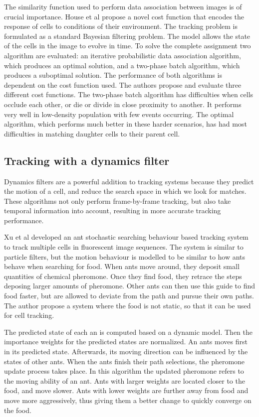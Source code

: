 \documentclass[12pt,a4paper,openany]{book}
\begin{document}
The similarity function used to perform data association between images is of crucial importance. House et al \cite{house09} propose a novel cost function that encodes the response of cells to conditions of their environment. The tracking problem is formulated as a standard Bayesian filtering problem. The model allows the state of the cells in the image to evolve in time. To solve the complete assignment two algorithm are evaluated: an iterative probabilistic data association algorithm, which produces an optimal solution, and a two-phase batch algorithm, which produces a suboptimal solution. The performance of both algorithms is dependent on the cost function used. The authors propose and evaluate three different cost functions. The two-phase batch algorithm has difficulties when cells occlude each other, or die or divide in close proximity to another. It performs very well in low-density population with few events occurring. The optimal algorithm, which performs much better in these harder scenarios, has had most difficulties in matching daughter cells to their parent cell.


\subsection{Tracking with a dynamics filter}

Dynamics filters are a powerful addition to tracking systems because they predict the motion of a cell, and reduce the search space in which we look for matches. These algorithms not only perform frame-by-frame tracking, but also take temporal information into account, resulting in more accurate tracking performance.

Xu et al \cite{xu12} developed an ant stochastic searching behaviour based tracking system to track multiple cells in fluorescent image sequences. The system is similar to particle filters, but the motion behaviour is modelled to be similar to how ants behave when searching for food. When ants move around, they deposit small quantities of chemical pheromone. Once they find food, they retrace the steps deposing larger amounts of pheromone. Other ants can then use this guide to find food faster, but are allowed to deviate from the path and pursue their own paths. The author propose a system where the food is not static, so that it can be used for cell tracking.

The predicted state of each an is computed based on a dynamic model. Then the importance weights for the predicted states are normalized. An ants moves first in its predicted state. Afterwards, its moving direction can be influenced by the states of other ants. When the ants finish their path selections, the pheromone update process takes place. In this algorithm the updated pheromone refers to the moving ability of an ant. Ants with larger weights are located closer to the food, and move slower. Ants with lower weights are further away from food and move more aggressively, thus giving them a better change to quickly converge on the food.
\end{document}
